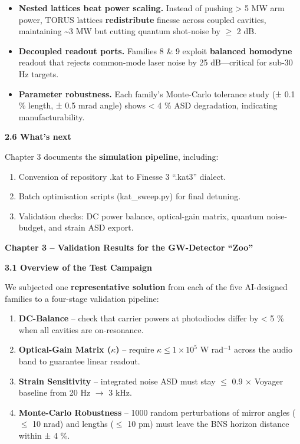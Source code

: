 \documentclass[]{article}
\begin{document}
\begin{itemize}
\item
  \textbf{Nested lattices beat power scaling.} Instead of pushing
  \textgreater{} 5 MW arm power, TORUS lattices \textbf{redistribute}
  finesse across coupled cavities, maintaining \textasciitilde{}3 MW but
  cutting quantum shot-noise by $\geq$ 2 dB.
\item
  \textbf{Decoupled readout ports.} Families 8 \& 9 exploit
  \textbf{balanced homodyne} readout that rejects common-mode laser
  noise by 25 dB---critical for sub-30 Hz targets.
\item
  \textbf{Parameter robustness.} Each family's Monte-Carlo tolerance
  study (± 0.1 \% length, ± 0.5 mrad angle) shows \textless{} 4 \% ASD
  degradation, indicating manufacturability.
\end{itemize}

\textbf{2.6 What's next}

Chapter 3 documents the \textbf{simulation pipeline}, including:

\begin{enumerate}
\def\labelenumi{\arabic{enumi}.}
\item
  Conversion of repository .kat to Finesse 3 ``.kat3'' dialect.
\item
  Batch optimisation scripts (kat\_sweep.py) for final detuning.
\item
  Validation checks: DC power balance, optical-gain matrix, quantum
  noise-budget, and strain ASD export.
\end{enumerate}

\textbf{Chapter 3 -- Validation Results for the GW-Detector ``Zoo''}

\textbf{3.1 Overview of the Test Campaign}

We subjected one \textbf{representative solution} from each of the five
AI-designed families to a four-stage validation pipeline:

\begin{enumerate}
\def\labelenumi{\arabic{enumi}.}
\item
  \textbf{DC-Balance} -- check that carrier powers at photodiodes differ
  by \textless{} 5 \% when all cavities are on-resonance.
\item
  \textbf{Optical-Gain Matrix ($\kappa$)} -- require $\kappa \leq 1 \times 10^5$ W rad$^{-1}$ across
  the audio band to guarantee linear readout.
\item
  \textbf{Strain Sensitivity} -- integrated noise ASD must stay $\leq$ 0.9 $\times$
  Voyager baseline from 20 Hz $\rightarrow$ 3 kHz.
\item
  \textbf{Monte-Carlo Robustness} -- 1000 random perturbations of mirror
  angles ($\leq$ 10 nrad) and lengths ($\leq$ 10 pm) must leave the BNS horizon
  distance within ± 4 \%.
\end{enumerate}
\end{document}

